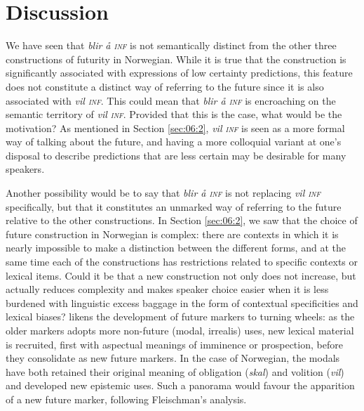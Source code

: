\documentclass[output=paper,colorlinks,citecolor=brown]{langscibook}
\begin{document}
\section{Discussion}\label{sec:06:5}

We have seen that \textit{blir å \textsc{inf}} is not semantically distinct from the other three constructions of futurity in Norwegian. While it is true that the construction is significantly associated with expressions of low certainty predictions, this feature does not constitute a distinct way of referring to the future since it is also associated with \textit{vil \textsc{inf}}. This could mean that \textit{blir å \textsc{inf}} is encroaching on the semantic territory of \textit{vil \textsc{inf}}. Provided that this is the case, what would be the motivation? As mentioned in Section \ref{sec:06:2}, \textit{vil \textsc{inf}} is seen as a more formal way of talking about the future, and having a more colloquial variant at one’s disposal to describe predictions that are less certain may be desirable for many speakers.

Another possibility would be to say that \textit{blir å \textsc{inf}} is not replacing \textit{vil \textsc{inf}} specifically, but that it constitutes an unmarked way of referring to the future relative to the other constructions. In Section \ref{sec:06:2}, we saw that the choice of future construction in Norwegian is complex: there are contexts in which it is nearly impossible to make a distinction between the different forms, and at the same time each of the constructions has restrictions related to specific contexts or lexical items. Could it be that a new construction not only does not increase, but actually reduces complexity and makes speaker choice easier when it is less burdened with linguistic excess baggage in the form of contextual specificities and lexical biases? \citet{Fleischman1982} likens the development of future markers to turning wheels: as the older markers adopts more non-future (modal, irrealis) uses, new lexical material is recruited, first with aspectual meanings of imminence or prospection, before they consolidate as new future markers. In the case of Norwegian, the modals have both retained their original meaning of obligation (\textit{skal}) and volition (\textit{vil}) and developed new epistemic uses. Such a panorama would favour the apparition of a new future marker, following Fleischman’s analysis.
\end{document}

